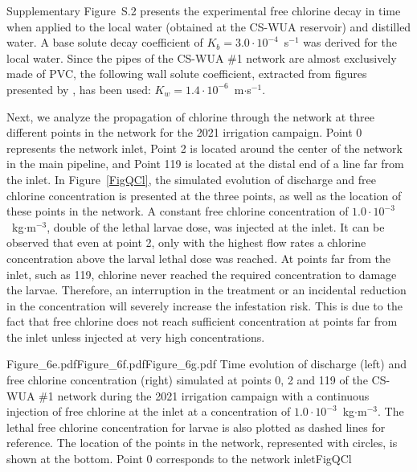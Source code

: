 \documentclass[review,authoryear]{elsarticle}
\begin{document}
Supplementary Figure~S.2 presents the experimental free chlorine decay in time
when applied to the local water (obtained at the CS-WUA reservoir) and distilled
water. A base solute decay coefficient of $K_b=3.0\cdot10^{-4}$~s$^{-1}$ was
derived for the local water. Since the pipes of the CS-WUA \#1 network are
almost exclusively made of PVC, the following wall solute coefficient, extracted
from figures presented by \citet{AlJasser07}, has been used:
$K_w=1.4\cdot10^{-6}$~m$\cdot$s$^{-1}$.

Next, we analyze the propagation of chlorine through the network at three
different points in the network for the 2021 irrigation campaign. Point 0
represents the network inlet, Point 2 is located around the center of the
network in the main pipeline, and Point 119 is located at the distal end of a
line far from the inlet. In Figure~\ref{FigQCl}, the simulated evolution of
discharge and free chlorine concentration is presented at the three points, as
well as the location of these points in the network. A constant free chlorine
concentration of $1.0\cdot10^{-3}$~kg$\cdot$m$^{-3}$, double of the lethal
larvae dose, was injected at the inlet. It can be observed that even at point 2,
only with the highest flow rates a chlorine concentration above the larval
lethal dose was reached. At points far from the inlet, such as 119, chlorine
never reached the required concentration to damage the larvae. Therefore, an
interruption in the treatment or an incidental reduction in the concentration
will severely increase the infestation risk. This is due to the fact that free
chlorine does not reach sufficient concentration at points far from the inlet
unless injected at very high concentrations.

{Figure_6e.pdf}{Figure_6f.pdf}{Figure_6g.pdf}
{Time evolution of discharge (left) and free chlorine concentration (right)
simulated at points 0, 2 and 119 of the CS-WUA \#1 network during the 2021
irrigation campaign with a continuous injection of free chlorine at the inlet at
a concentration of $1.0\cdot10^{-3}$~kg$\cdot$m$^{-3}$. The lethal free
chlorine concentration for larvae is also plotted as dashed lines for reference.
The location of the points in the network, represented with circles, is shown at
the bottom. Point 0 corresponds to the network inlet}{FigQCl}
\end{document}
